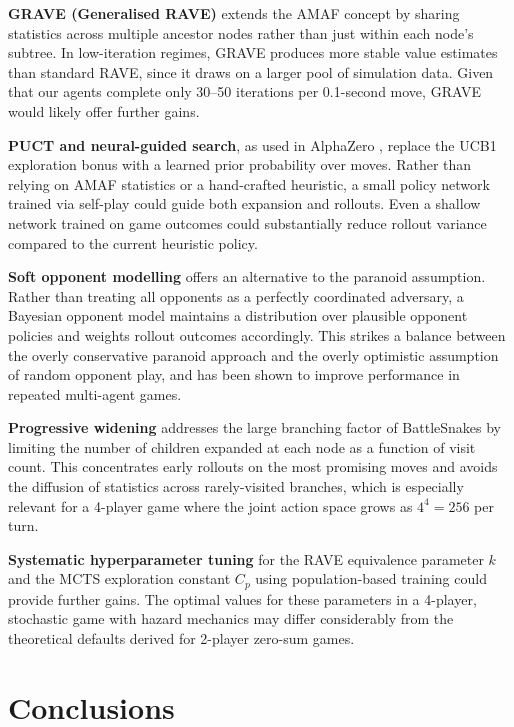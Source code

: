 \documentclass[12pt,a4paper]{article}
\begin{document}
\textbf{GRAVE (Generalised RAVE)} \citep{cazenave2015generalized} extends the AMAF concept by sharing statistics across multiple ancestor nodes rather than just within each node's subtree. In low-iteration regimes, GRAVE produces more stable value estimates than standard RAVE, since it draws on a larger pool of simulation data. Given that our agents complete only 30–50 iterations per 0.1-second move, GRAVE would likely offer further gains.

\textbf{PUCT and neural-guided search}, as used in AlphaZero \citep{silver2017mastering}, replace the UCB1 exploration bonus with a learned prior probability over moves. Rather than relying on AMAF statistics or a hand-crafted heuristic, a small policy network trained via self-play could guide both expansion and rollouts. Even a shallow network trained on game outcomes could substantially reduce rollout variance compared to the current heuristic policy.

\textbf{Soft opponent modelling} offers an alternative to the paranoid assumption. Rather than treating all opponents as a perfectly coordinated adversary, a Bayesian opponent model \citep{albrecht2018autonomous} maintains a distribution over plausible opponent policies and weights rollout outcomes accordingly. This strikes a balance between the overly conservative paranoid approach and the overly optimistic assumption of random opponent play, and has been shown to improve performance in repeated multi-agent games.

\textbf{Progressive widening} \citep{coulom2007computing} addresses the large branching factor of BattleSnakes by limiting the number of children expanded at each node as a function of visit count. This concentrates early rollouts on the most promising moves and avoids the diffusion of statistics across rarely-visited branches, which is especially relevant for a 4-player game where the joint action space grows as $4^4 = 256$ per turn.

\textbf{Systematic hyperparameter tuning} for the RAVE equivalence parameter $k$ and the MCTS exploration constant $C_p$ using population-based training \citep{jaderberg2017population} could provide further gains. The optimal values for these parameters in a 4-player, stochastic game with hazard mechanics may differ considerably from the theoretical defaults derived for 2-player zero-sum games.

\section{Conclusions}\label{sec:conclusion}
\end{document}
